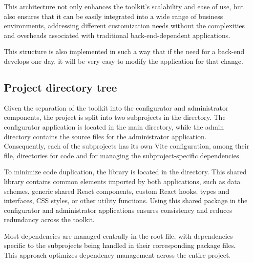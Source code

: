 This architecture not only enhances the toolkit's scalability and ease of use, but also ensures that it can be easily integrated into a wide range of business environments, addressing different customization needs without the complexities and overheads associated with traditional back-end-dependent applications.

This structure is also implemented in such a way that if the need for a back-end develops one day, it will be very easy to modify the application for that change.

\subsection{Project directory tree}

\vspace{16pt}

Given the separation of the toolkit into the configurator and administrator components, the project is split into two subprojects in the  directory. The configurator application is located in the main directory, while the admin directory contains the source files for the administrator application. Consequently, each of the subprojects has its own Vite configuration, among their  file,  directories for code and  for managing the subproject-specific dependencies. 

To minimize code duplication, the  library is located in the  directory. This shared library contains common elements imported by both applications, such as data schemes, generic shared React components, custom React hooks, types and interfaces, CSS styles, or other utility functions. Using this shared package in the configurator and administrator applications ensures consistency and reduces redundancy across the toolkit.

Most dependencies are managed centrally in the root  file, with dependencies specific to the subprojects being handled in their corresponding package files. This approach optimizes dependency management across the entire project.

